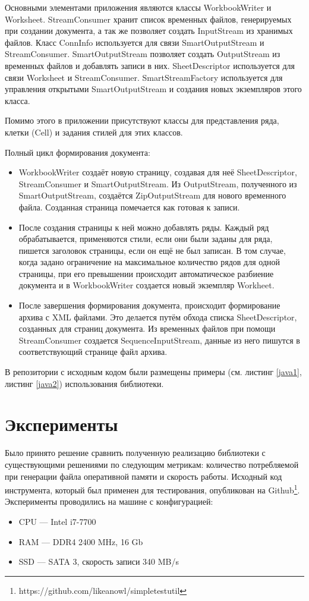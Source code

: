 \documentclass[14pt]{matmex-diploma-custom}
\begin{document}
Основными элементами приложения являются классы WorkbookWriter и Worksheet. StreamConsumer хранит список временных файлов, генерируемых при создании документа, а так же позволяет создать InputStream из хранимых файлов. Класс ConnInfo используется для связи SmartOutputStream и StreamConsumer. SmartOutputStream позволяет создать OutputStream из временных файлов и добавлять записи в них. SheetDescriptor используется для связи Worksheet и StreamConsumer. SmartStreamFactory используется для управления открытыми SmartOutputStream и создания новых экземпляров этого класса.

Помимо этого в приложении присутствуют классы для представления ряда, клетки (Cell) и задания стилей для этих классов.

Полный цикл формирования документа: 
\begin{itemize}
    \item WorkbookWriter создаёт новую страницу, создавая для неё SheetDescriptor, StreamConsumer и SmartOutputStream. Из OutputStream, полученного из SmartOutputStream, создаётся ZipOutputStream для нового временного файла. Созданная страница помечается как готовая к записи.
    \item После создания страницы к ней можно добавлять ряды. Каждый ряд обрабатывается, применяются стили, если они были заданы для ряда, пишется заголовок страницы, если он ещё не был записан. В том случае, когда задано ограничение на максимальное количество рядов для одной страницы, при его превышении происходит автоматическое разбиение документа и в WorkbookWriter создается новый экземпляр Workheet.
    \item После завершения формирования документа, происходит формирование архива с XML файлами. Это делается путём обхода списка SheetDescriptor, созданных для страниц документа. Из временных файлов при помощи StreamConsumer создается SequenceInputStream, данные из него пишутся в соответствующий странице файл архива.
\end{itemize}
В репозитории с исходным кодом были размещены примеры (см. листинг \ref{java1}, листинг \ref{java2}) использования библиотеки.

\section{Эксперименты}
Было принято решение сравнить полученную реализацию библиотеки с существующими решениями по следующим метрикам: количество потребляемой при генерации файла оперативной памяти и скорость работы. Исходный код инструмента, который был применен для тестирования, опубликован на Github\footnote{https://github.com/likeanowl/simpletestutil}.
Эксперименты проводились на машине с конфигурацией: 
\begin{itemize}
    \item CPU --- Intel i7-7700
    \item RAM --- DDR4 2400 MHz, 16 Gb
    \item SSD --- SATA 3, скорость записи 340 MB/s
\end{itemize}
\end{document}
